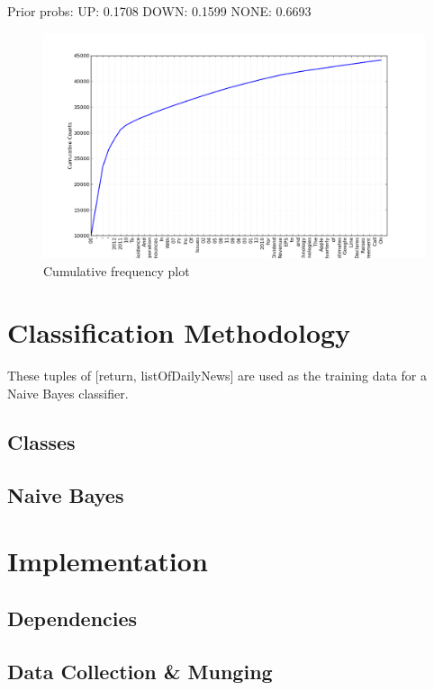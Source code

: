 \documentclass[twocolumn]{article}
\begin{document}
Prior probs:
UP: 0.1708
DOWN: 0.1599
NONE:  0.6693

\begin{figure}[h!]
\centering
\includegraphics[scale=0.25]{cum_graph.png}
\caption{Cumulative frequency plot}
\end{figure}
\section{Classification Methodology}
These tuples of [return, listOfDailyNews] are used as the training data for a Naive Bayes classifier. 
\subsection{Classes}

\subsection{Naive Bayes}


\section{Implementation}

\subsection{Dependencies}
\subsection{Data Collection \& Munging}
\end{document}
